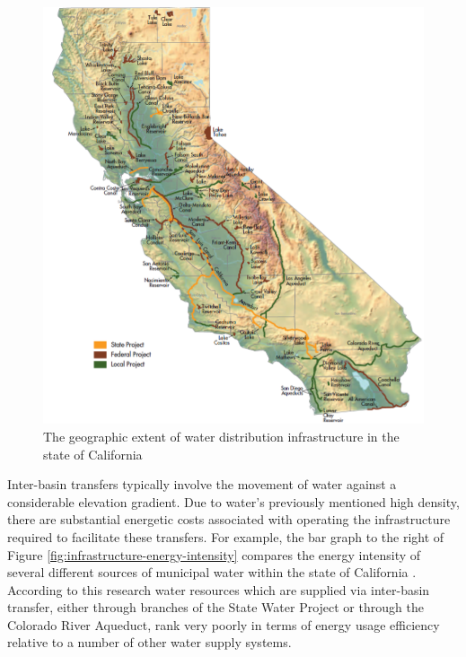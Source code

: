        \begin{figure}[!h]
       \centering
       \includegraphics[width=5.5in]{figures/infrastructure.png}
       \caption[Characteristics of Water Distribution Infrastructure]{The geographic extent of water distribution infrastructure in the state of California \cite{Schwarzenegger2005}}
       \label{fig:california-distribution}
     \end{figure}
    
Inter-basin transfers typically involve the movement of water against a considerable elevation gradient. Due to water's previously mentioned high density, there are substantial energetic costs associated with operating the infrastructure required to facilitate these transfers. For example, the bar graph to the right of Figure \ref{fig:infrastructure-energy-intensity} compares the energy intensity of several different sources of municipal water within the state of California \cite{Wilkinson2007}. According to this research water resources which are supplied via inter-basin transfer, either through branches of the State Water Project or through the Colorado River Aqueduct, rank very poorly in terms of energy usage efficiency relative to a number of other water supply systems.

